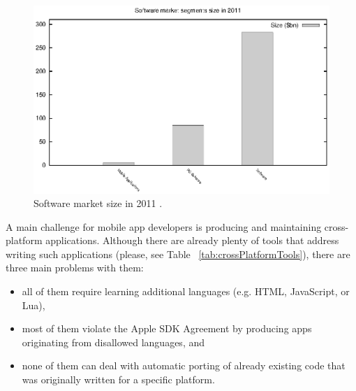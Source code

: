 \documentclass[parskip]{cs4rep}
\begin{document}
\begin{figure}[h!]
  \label{fig:softwareMarket2011}
  \caption{Software market size in 2011 \cite{P1} \cite{P2} \cite{P3}.}
  \centering
    \includegraphics[width=1.0\textwidth]{markets}
\end{figure}

A main challenge for mobile app developers is producing and maintaining cross-platform applications. Although there are already plenty of tools that address writing such applications (please, see Table ~\ref{tab:crossPlatformTools}), there are three main problems with them:

\begin{itemize}
\item
all of them require learning additional languages (e.g. HTML, JavaScript, or
Lua),
\item
most of them violate the Apple SDK Agreement \cite{P5} \cite{P6} by
producing apps originating from disallowed languages, and
\item
none of them can deal with automatic porting of already existing code that was
originally written for a specific platform.
\end{itemize}
\end{document}
